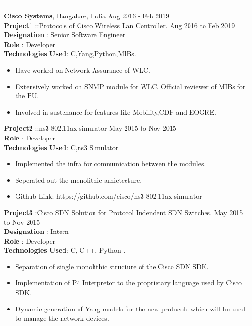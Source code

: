 \documentclass{resumeclass}
\begin{document}
\begin{resume}
\hfill   
\noindent\rule{20cm}{0.4pt}

{\large \textbf{Cisco Systems}, Bangalore, India} \hfill        Aug 2016 - Feb 2019 \\[0.5pt]

\textbf{Project1} ::Protocols of Cisco Wireless Lan Controller. \hfill      Aug 2016 to Feb 2019 \\
\textbf{Designation} : Senior Software Engineer \\
\textbf{Role} : Developer \\
\textbf{Technologies Used}: C,Yang,Python,MIBs.

 \begin{itemize} \itemsep -2pt
  \item Have worked on Network Assurance of WLC.
  \item Extensively worked on SNMP module for WLC. Official reviewer of MIBs for the BU.
  \item Involved in sustenance for features like Mobility,CDP and EOGRE.
\end{itemize} \vspace{-6pt}


\textbf{Project2} ::ns3-802.11ax-simulator \hfill      May 2015 to Nov 2015 \\

\textbf{Role} : Developer \\
\textbf{Technologies Used}: C,ns3 Simulator

 \begin{itemize} \itemsep -2pt
  \item Implemented the infra for communication between the modules.
  \item Seperated out the monolithic arhictecture.
  \item Github Link: https://github.com/cisco/ns3-802.11ax-simulator
\end{itemize} \vspace{-6pt}

\textbf{Project3} :Cisco SDN Solution for Protocol Indendent SDN Switches. \hfill      May 2015 to Nov 2015 \\
\textbf{Designation} : Intern \\
\textbf{Role} : Developer \\
\textbf{Technologies Used}: C, C++, Python .

 \begin{itemize} \itemsep -2pt
  \item  Separation of single monolithic structure of the Cisco SDN SDK.
  \item Implementation of P4 Interpretor to the proprietary language used by Cisco SDK.
  \item Dynamic generation of Yang models for the new protocols which will be used to manage the network devices.
\end{itemize} \vspace{-6pt}


\end{resume}
\end{document}
